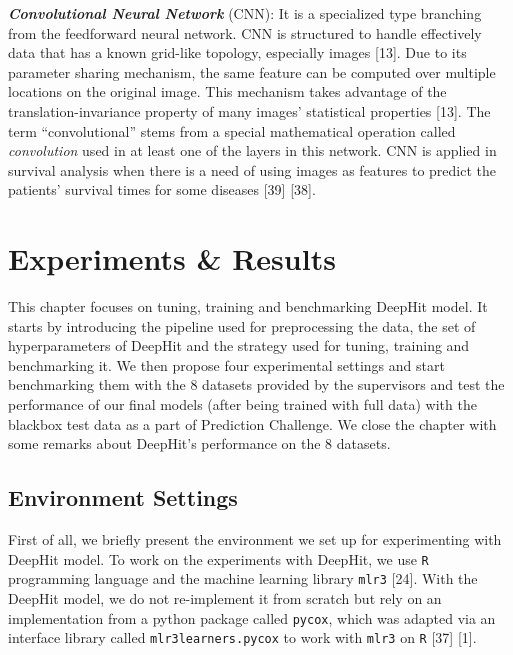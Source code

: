 \documentclass[
]{article}
\begin{document}
\textbf{\emph{Convolutional Neural Network}} (CNN): It is a specialized type branching from the feedforward neural network. CNN is structured to handle effectively data that has a known grid-like topology, especially images {[}13{]}. Due to its parameter sharing mechanism, the same feature can be computed over multiple locations on the original image. This mechanism takes advantage of the translation-invariance property of many images' statistical properties {[}13{]}. The term ``convolutional'' stems from a special mathematical operation called \emph{convolution} used in at least one of the layers in this network. CNN is applied in survival analysis when there is a need of using images as features to predict the patients' survival times for some diseases {[}39{]} {[}38{]}.

\hypertarget{experiments-results}{%
\section{Experiments \& Results}\label{experiments-results}}

This chapter focuses on tuning, training and benchmarking DeepHit model. It starts by introducing the pipeline used for preprocessing the data, the set of hyperparameters of DeepHit and the strategy used for tuning, training and benchmarking it. We then propose four experimental settings and start benchmarking them with the 8 datasets provided by the supervisors and test the performance of our final models (after being trained with full data) with the blackbox test data as a part of Prediction Challenge. We close the chapter with some remarks about DeepHit's performance on the 8 datasets.

\hypertarget{environment-settings}{%
\subsection{Environment Settings}\label{environment-settings}}

First of all, we briefly present the environment we set up for experimenting with DeepHit model. To work on the experiments with DeepHit, we use \texttt{R} programming language and the machine learning library \texttt{mlr3} {[}24{]}. With the DeepHit model, we do not re-implement it from scratch but rely on an implementation from a python package called \texttt{pycox}, which was adapted via an interface library called \texttt{mlr3learners.pycox} to work with \texttt{mlr3} on \texttt{R} {[}37{]} {[}1{]}.
\end{document}
